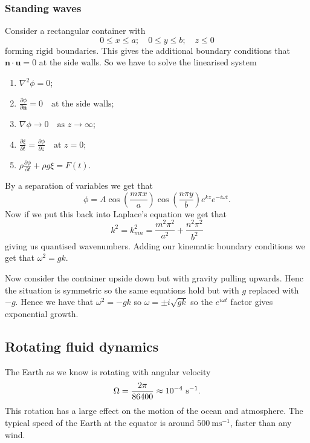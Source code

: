 \documentclass{article}
\begin{document}
\subsubsection{Standing waves}
Consider a rectangular container with
\[
  0\le x \le a; \quad 0 \le y \le b; \quad z\le 0
\]
forming rigid boundaries. This gives the additional boundary conditions that $ \mathbf n \cdot\mathbf u = 0 $ at the side walls. So we have to solve the linearised system
\begin{enumerate}
	\item $ \nabla^2\phi = 0$;
	\item $ \frac{\partial \phi}{\partial \mathbf n} = 0 \quad\text{at the side walls} $;
	\item $ \nabla \phi \to 0 \quad\text{as } z\to\infty $;
	\item $\frac{\partial \xi}{\partial t}=\frac{\partial \phi}{\partial z} \quad \text{at } z=0 $;
	\item $ \rho \frac{\partial \phi}{\partial t} + \rho g \xi = F(t) $.
\end{enumerate}
By a separation of variables we get that
\[
	\phi = A\cos\left(\frac{m\pi x}a\right)\cos\left(\frac{n\pi y}b\right) e^{kz}e^{-i\omega t}.
\]
Now if we put this back into Laplace's equation we get that
\[
	k^2 = k_{mn}^2 = \frac{m^2\pi^2}{a^2} + \frac{n^2\pi^2}{b^2}
\]
giving us quantised wavenumbers. Adding our kinematic boundary conditions we get that $ \omega^2 = g k $.\par
Now consider the container upside down but with gravity pulling upwards. Henc the situation is symmetric so the same equations hold but with $ g $ replaced with $ -g $. Hence we have that $ \omega^2 = -gk $ so $ \omega = \pm i\sqrt{gk} $ so the $ e^{i\omega t} $ factor gives exponential growth.
\subsection{Rotating fluid dynamics}
The Earth as we know is rotating with angular velocity
\[
	\Omega = \frac{2\pi}{86400} \approx 10^{-4} \ \inv{\mathrm s}.
\]
This rotation has a large effect on the motion of the ocean and atmosphere. The typical speed of the Earth at the equator is around $ 500\ \mathrm{ms}^{-1} $, faster than any wind.
\end{document}
